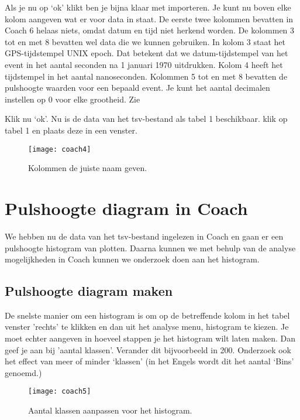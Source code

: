 Als je nu op `ok' klikt ben je bijna klaar met importeren. Je kunt nu boven elke
kolom aangeven wat er voor data in staat. De eerste twee kolommen bevatten in Coach 6
helaas niets, omdat datum en tijd niet herkend worden. De kolommen 3 tot en met
8 bevatten wel data die we kunnen gebruiken. In kolom 3 staat het GPS-tijdstempel UNIX epoch.
Dat betekent dat we datum-tijdstempel van het event in het aantal seconden na 1 januari 1970 uitdrukken.
Kolom 4 heeft het tijdstempel in het aantal nanoseconden.
Kolommen 5 tot en met 8 bevatten de pulshoogte waarden voor een bepaald event.
Je kunt het aantal decimalen instellen op 0 voor elke grootheid. Zie 

Klik nu `ok'. Nu is de data van het tsv-bestand als tabel 1 beschikbaar.
klik op tabel 1 en plaats deze in een venster.

\begin{figure}
    \centering
    \texttt{[image: coach4]}
    \caption{Kolommen de juiste naam geven.}
    \label{fig:coach4}
\end{figure}


\section{Pulshoogte diagram in Coach}

We hebben nu de data van het tsv-bestand ingelezen in Coach en gaan er een
pulshoogte histogram van plotten. Daarna kunnen we met behulp van de analyse
mogelijkheden in Coach kunnen we onderzoek doen aan het histogram.

\subsection{Pulshoogte diagram maken}

De snelste manier om een histogram is om op de betreffende kolom in het tabel venster
'rechts' te klikken en dan uit het analyse menu, histogram te kiezen.
Je moet echter aangeven in hoeveel stappen je het histogram wilt laten maken.
Dan geef je aan bij 'aantal klassen'. Verander dit bijvoorbeeld in 200. Onderzoek
ook het effect van meer of minder `klassen' (in het Engels wordt dit het aantal
`Bins' genoemd.)

\begin{figure}
    \centering
    \texttt{[image: coach5]}
    \caption{Aantal klassen aanpassen voor het histogram.}
    \label{fig:coach5}
\end{figure}

